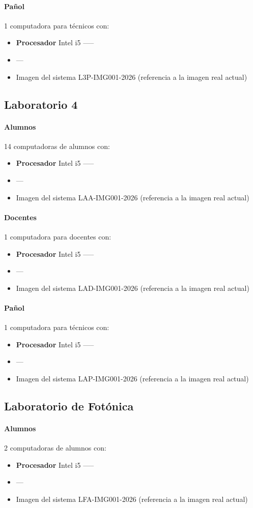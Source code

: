 \paragraph{Pañol} 1 computadora para técnicos con:
\begin{itemize}
    \item \textbf{Procesador} Intel i5 -----
    \item ---
    \item Imagen del sistema L3P-IMG001-2026 (referencia a la imagen real actual)
\end{itemize}

\subsection{Laboratorio 4}

\paragraph{Alumnos} 14 computadoras de alumnos con:
\begin{itemize}
    \item \textbf{Procesador} Intel i5 -----
    \item ---
    \item Imagen del sistema LAA-IMG001-2026 (referencia a la imagen real actual)
\end{itemize}

\paragraph{Docentes} 1 computadora para docentes con:
\begin{itemize}
    \item \textbf{Procesador} Intel i5 -----
    \item ---
    \item Imagen del sistema LAD-IMG001-2026 (referencia a la imagen real actual)
\end{itemize}

\paragraph{Pañol} 1 computadora para técnicos con:
\begin{itemize}
    \item \textbf{Procesador} Intel i5 -----
    \item ---
    \item Imagen del sistema LAP-IMG001-2026 (referencia a la imagen real actual)
\end{itemize}

\subsection{Laboratorio de Fotónica}

\paragraph{Alumnos} 2 computadoras de alumnos con:
\begin{itemize}
    \item \textbf{Procesador} Intel i5 -----
    \item ---
    \item Imagen del sistema LFA-IMG001-2026 (referencia a la imagen real actual)
\end{itemize}
